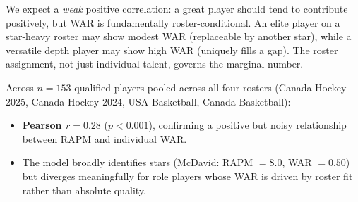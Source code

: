 \documentclass[11pt,letterpaper]{article}
\begin{document}
We expect a \emph{weak} positive correlation: a great player should
tend to contribute positively, but WAR is fundamentally
roster-conditional. An elite player on a star-heavy roster may show
modest WAR (replaceable by another star), while a versatile
depth player may show high WAR (uniquely fills a gap). The roster
assignment, not just individual talent, governs the marginal number.

Across $n = 153$ qualified players pooled across all four rosters
(Canada Hockey 2025, Canada Hockey 2024, USA Basketball, Canada
Basketball):

\begin{itemize}[leftmargin=*]
  \item \textbf{Pearson $r = 0.28$} ($p < 0.001$), confirming a
    positive but noisy relationship between RAPM and individual WAR.
  \item The model broadly identifies stars (McDavid: RAPM $= 8.0$,
    WAR $= 0.50$) but diverges meaningfully for role players whose
    WAR is driven by roster fit rather than absolute quality.
\end{itemize}
\end{document}
